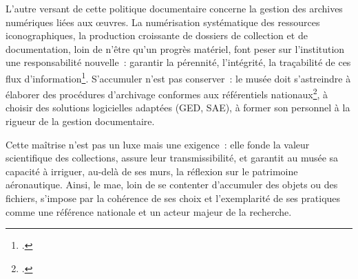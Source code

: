 L’autre versant de cette politique documentaire concerne la gestion des archives numériques liées aux œuvres. La numérisation systématique des ressources iconographiques, la production croissante de dossiers de collection et de documentation, loin de n’être qu’un progrès matériel, font peser sur l’institution une responsabilité nouvelle : garantir la pérennité, l’intégrité, la traçabilité de ces flux d’information\footcite{ministere_de_la_culture_documenter_2020,bechard_archives_2020}. S’accumuler n’est pas conserver : le musée doit s’astreindre à élaborer des procédures d’archivage conformes aux référentiels nationaux\footcite{comite_interministeriel_aux_archives_de_france_referentiel_nodate}, à choisir des solutions logicielles adaptées (GED, SAE), à former son personnel à la rigueur de la gestion documentaire.

Cette maîtrise n’est pas un luxe mais une exigence : elle fonde la valeur scientifique des collections, assure leur transmissibilité, et garantit au musée sa capacité à irriguer, au-delà de ses murs, la réflexion sur le patrimoine aéronautique. Ainsi, le \ac{mae}, loin de se contenter d’accumuler des objets ou des fichiers, s’impose par la cohérence de ses choix et l’exemplarité de ses pratiques comme une référence nationale et un acteur majeur de la recherche.
